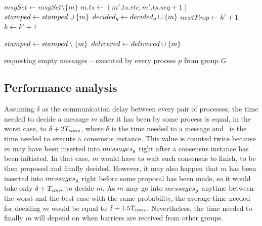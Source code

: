 \documentclass[times, 10pt]{article}
\begin{document}
\begin{algorithm}
\begin{distribalgo}[1]
\blankline
{}
    \STATE $msgSet \leftarrow msgSet \setminus \{m\}$
      \STATE $m.ts \leftarrow (m'.ts.rtc, m'.ts.seq + 1)$ \label{algline:chgts}
    \ENDIF     
     \label{algline:checkcons}
      \STATE $stamped \leftarrow stamped \cup \{m\}$
    \ENDIF
    \STATE $decided\text{$_g$} \leftarrow decided\text{$_g$} \cup \{m\}$
      \STATE {} \label{algline:barreq} 
    \ELSE
      \STATE {} 
    \ENDIF
  \ENDINDENT
  \STATE $nextProp \leftarrow k' + 1$
  \STATE $k \leftarrow k' + 1$
\ENDINDENT

\blankline
{}
  \STATE $stamped \leftarrow stamped \setminus \{m\}$
    \STATE {}
  \ENDIF
  \STATE $delivered \leftarrow delivered \cup \{m\}$

\blankline
\ENDINDENT

\caption{ requesting empty messages -- executed by every process $p$ from group $G$}
\label{algorithm:nullondemand}
\end{distribalgo}
\end{algorithm}
 
 \subsection{Performance analysis}
 
 Assuming $\delta$ as the communication delay between every pair of processes, the time needed to decide a message $m$ after it has been \amcast{} by some process is equal, in the worst case, to $\delta + 2T_{cons}$, where $\delta$ is the time needed to \rmdel{} a message and \tcons\ is the time needed to execute a consensus instance. This value is counted twice because $m$ may have been inserted into $messages\text{$_g$}$ right after a consensus instance has been initiated. In that case, $m$ would have to wait such consensus to finish, to be then proposed and finally decided. However, it may also happen that $m$ has been inserted into $messages\text{$_g$}$ right before some proposal has been made, so it would take only $\delta + T_{cons}$ to decide $m$. As $m$ may go into $messages\text{$_g$}$ anytime between the worst and the best case with the same probability, the average time needed for deciding $m$ would be equal to $\delta + 1.5T_{cons}$. Nevertheless, the time needed to finally \cons{} $m$ will depend on when barriers are received from other groups.
\end{document}
